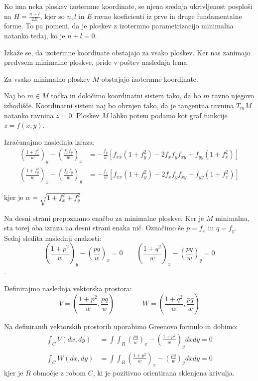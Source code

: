 \documentclass[mat1]{fmfdelo}
\begin{document}
Ko ima neka ploskev izotermne koordinate, se njena srednja ukrivljenost posploši na $H = \frac{n + l}{2E}$,
kjer so $n, l \text{ in } E$ ravno koeficienti iz prve in druge fundamentalne forme. 
To pa pomeni, da je ploskev z izotermno parametrizacijo minimalna natanko tedaj, ko je $n + l = 0$. 

Izkaže se, da izotermne koordinate obstajajo za vsako ploskev. Ker nas zanimajo predvsem minimalne ploskve,
pride v poštev naslednja lema.

\begin{lema}
    Za vsako minimalno ploskev $M$ obstajajo izotermne koordinate.
\end{lema}

\begin{dokaz}
    Naj bo $m \in M$ točka in določimo koordinatni sistem tako, da bo $m$ ravno njegovo izhodišče. 
    Koordinatni sistem naj bo obrnjen tako, da je tangentna ravnina $T_m M$ natanko ravnina $z = 0$.
    Ploskev $M$ lahko potem podamo kot graf funkcije $z = f(x, y)$.

    Izračunajmo naslednja izraza:
    \begin{align*}
        \left( \frac{1 + f_x^2}{w} \right)_y - \left( \frac{f_x f_y}{w} \right)_x &= - \frac{f_y}{w} \left[ f_{xx} (1 + f_y^2) - 2 f_x f_y f_{xy} + f_{yy} (1 + f_x^2) \right] \\
        \left( \frac{1 + f_y^2}{w} \right)_x - \left( \frac{f_x f_y}{w} \right)_y &= - \frac{f_x}{w} \left[ f_{xx} (1 + f_y^2) - 2 f_x f_y f_{xy} + f_{yy} (1 + f_x^2) \right]
    \end{align*}

    kjer je $w = \sqrt{1 + f_x^2 + f_y^2}$

    Na desni strani prepoznamo enačbo za minimalne ploskve. Ker je $M$ minimalna, sta torej oba izraza na desni strani enaka nič.
    Označimo še $p = f_x$ in $q = f_y$. Sedaj sledita naslednji enakosti:
    $$ \left( \frac{1 + p^2}{w} \right)_y - \left( \frac{pq}{w} \right)_x = 0 \qquad \left( \frac{1 + q^2}{w} \right)_x - \left( \frac{pq}{w} \right)_y = 0 $$.

    Definirajmo naslednja vektorska prostora:
    $$ V = \left( \frac{1 + p^2}{w} , \frac{pq}{w} \right)  \qquad\qquad W = \left( \frac{1 + q^2}{w} , \frac{pq}{w} \right) $$

    Na definiranih vektorskih prostorih uporabimo Greenovo formulo in dobimo:
    \begin{align*}
        \int_{C} V (dx, dy) &= \int\int_R \left( \frac{pq}{w} \right)_x - \left( \frac{1 + p^2}{w} \right)_y dx dy = 0 \\
        \int_{C} W (dx, dy) &= \int\int_R \left( \frac{1 + p^2}{w} \right)_x - \left( \frac{pq}{w} \right)_y  dx dy = 0 
    \end{align*}
    kjer je $R$ območje z robom $C$, ki je pozitivno orientirana sklenjena krivulja.


\end{dokaz}
\end{document}
